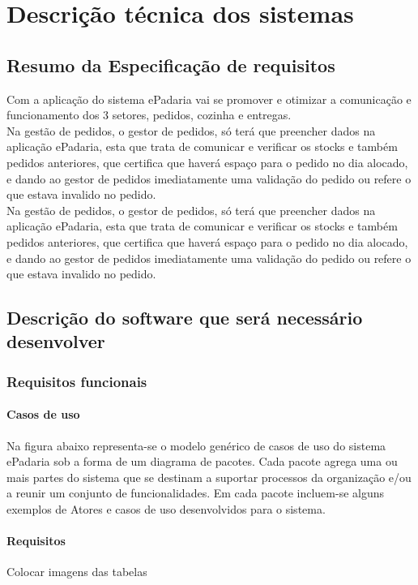 \usepackage{graphicx}
\chapter{Descrição técnica dos sistemas}
\label{descricao_tecnica_dos_sistemas}

\section{Resumo da Especificação de requisitos}
Com a aplicação do sistema ePadaria vai se promover e otimizar a comunicação e funcionamento dos 3 setores, pedidos, cozinha e entregas.\\
Na gestão de pedidos, o gestor de pedidos, só terá que preencher dados na aplicação ePadaria, esta que trata de comunicar e verificar os stocks e também pedidos anteriores, que certifica que haverá espaço para o pedido no dia alocado, e dando ao gestor de pedidos imediatamente uma validação do pedido ou
refere o que estava invalido no pedido.\\
Na gestão de pedidos, o gestor de pedidos, só terá que preencher dados na aplicação ePadaria, esta que trata de comunicar e verificar os stocks e também pedidos anteriores, que certifica que haverá espaço para o pedido no dia alocado, e dando ao gestor de pedidos imediatamente uma validação do pedido ou refere o que estava invalido no pedido.\\


\section{Descrição do software que será necessário desenvolver}
\subsection{Requisitos funcionais}
\subsubsection{Casos de uso}
Na figura abaixo representa-se o modelo genérico de casos de uso do sistema ePadaria sob a forma de um diagrama de pacotes. Cada pacote agrega uma ou mais partes do sistema que se destinam a suportar processos da organização e/ou a reunir um conjunto de funcionalidades. Em cada pacote incluem-se alguns exemplos de Atores e casos de uso desenvolvidos para o sistema.

\subsubsection{Requisitos}
Colocar imagens das tabelas
